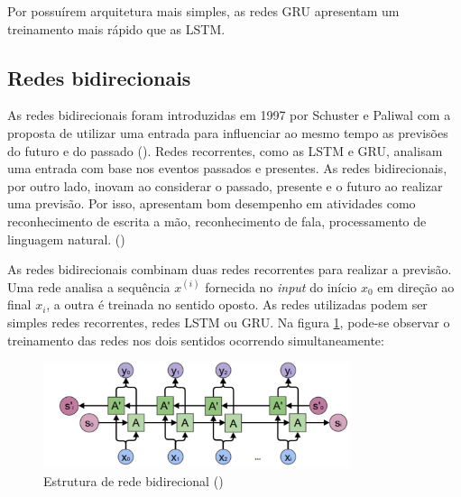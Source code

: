 Por possuírem arquitetura mais simples, as redes GRU 
apresentam um treinamento mais rápido que as LSTM.

\subsection{Redes bidirecionais}

As redes bidirecionais foram introduzidas em 1997 por Schuster e Paliwal com a 
proposta de utilizar uma entrada para influenciar ao mesmo tempo as previsões 
do futuro e do passado (\cite{brnn}).
Redes recorrentes, como as LSTM e GRU, analisam uma entrada com base nos 
eventos passados e presentes. As redes bidirecionais, por outro lado, inovam ao 
considerar o passado, presente e o futuro ao realizar uma previsão. Por isso, 
apresentam bom desempenho em atividades como reconhecimento de escrita a mão, reconhecimento de
fala, processamento de linguagem natural. (\cite{bidirectional})

As redes bidirecionais combinam duas redes recorrentes para realizar a previsão. 
Uma rede analisa a sequência $x^{(i)}$
fornecida no \textit{input} do início $x_0$ em direção ao final $x_i$, a outra é treinada
no sentido oposto. As redes utilizadas podem ser simples redes 
recorrentes, redes LSTM ou GRU. Na figura \ref{fig:bi}, pode-se observar o 
treinamento das redes nos dois sentidos ocorrendo simultaneamente:

\begin{figure}[H]
  \centering
  \includegraphics[width=9cm]{../figuras/redes/bi.png}
  \caption{Estrutura de rede bidirecional (\cite{bidirectional})}
  \label{fig:bi}
\end{figure}
